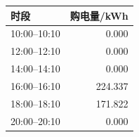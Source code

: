 \begin{tabular}{lr}
\toprule
时段 & 购电量/kWh \\
\midrule
10:00--10:10 & 0.000 \\
12:00--12:10 & 0.000 \\
14:00--14:10 & 0.000 \\
16:00--16:10 & 224.337 \\
18:00--18:10 & 171.822 \\
20:00--20:10 & 0.000 \\
\bottomrule
\end{tabular}
